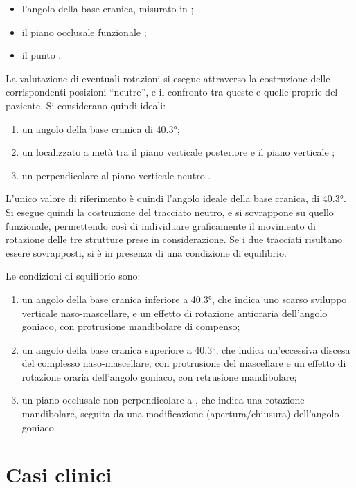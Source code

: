 \begin{itemize}
\item l'angolo della base cranica, misurato in ;
\item il piano occlusale funzionale ;
\item il punto .
\end{itemize}

La valutazione di eventuali rotazioni si esegue attraverso la costruzione delle corrispondenti posizioni ``neutre'', e il confronto tra queste e quelle proprie del paziente. Si considerano quindi ideali:

\begin{enumerate}
\item un angolo della base cranica di 40.3°;
\item un  localizzato a metà tra il piano verticale posteriore  e il piano verticale ;
\item un  perpendicolare al piano verticale neutro .
\end{enumerate}

L'unico valore di riferimento è quindi l'angolo ideale della base cranica, di 40.3°. Si esegue quindi la costruzione del tracciato neutro, e si sovrappone su quello funzionale, permettendo così di individuare graficamente il movimento di rotazione delle tre strutture prese in considerazione. Se i due tracciati risultano essere sovrapposti, si è in presenza di una condizione di equilibrio.

Le condizioni di squilibrio sono:

\begin{enumerate}
\item un angolo della base cranica inferiore a 40.3°, che indica uno scarso sviluppo verticale naso-mascellare, e un effetto di rotazione antioraria dell'angolo goniaco, con protrusione mandibolare di compenso;
\item un angolo della base cranica superiore a 40.3°, che indica un'eccessiva discesa del complesso naso-mascellare, con protrusione del mascellare e un effetto di rotazione oraria dell'angolo goniaco, con retrusione mandibolare;
\item un piano occlusale non perpendicolare a , che indica una rotazione mandibolare, seguita da una modificazione (apertura/chiusura) dell'angolo goniaco.
\end{enumerate}

\section{Casi clinici}